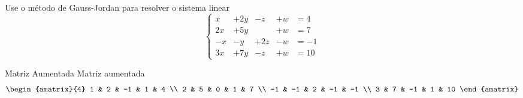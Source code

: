 \begin{question}
  Use o método de Gauss-Jordan para resolver o sistema linear
  \[
    \left\{\begin{array}{rrrrr}
      x  & + 2y & - z & + w & = 4  \\
      2x & + 5y &     & + w & = 7  \\
      -x & -  y & +2z & - w & = -1 \\
      3x & + 7y & - z & + w & = 10
    \end{array}\right.
  \]
\end{question}

\begin{resolution}{Matriz Aumentada}
  Matriz aumentada
  \[
    \begin{amatrix}{4}
      1  & 2  & -1 & 1  & 4  \\
      2  & 5  & 0  & 1  & 7  \\
      -1 & -1 & 2  & -1 & -1 \\
      3  & 7  & -1 & 1  & 10
    \end{amatrix}
  \]
\end{resolution}

